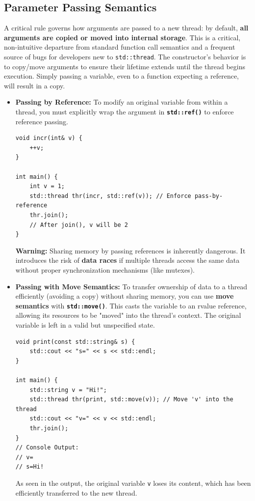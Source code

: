 \documentclass{article} %
\begin{document}
\subsection{Parameter Passing Semantics}
A critical rule governs how arguments are passed to a new thread: by default, \textbf{all arguments are copied or moved into internal storage}. This is a critical, non-intuitive departure from standard function call semantics and a frequent source of bugs for developers new to \texttt{std::thread}. The constructor's behavior is to copy/move arguments to ensure their lifetime extends until the thread begins execution. Simply passing a variable, even to a function expecting a reference, will result in a copy.
\begin{itemize}
    \item \textbf{Passing by Reference:} To modify an original variable from within a thread, you must explicitly wrap the argument in \textbf{\texttt{std::ref()}} to enforce reference passing.
\begin{verbatim}
void incr(int& v) {
    ++v;
}

int main() {
    int v = 1;
    std::thread thr(incr, std::ref(v)); // Enforce pass-by-reference
    thr.join();
    // After join(), v will be 2
}
\end{verbatim}
\noindent \textbf{Warning:} Sharing memory by passing references is inherently dangerous. It introduces the risk of \textbf{data races} if multiple threads access the same data without proper synchronization mechanisms (like mutexes).
    \item \textbf{Passing with Move Semantics:} To transfer ownership of data to a thread efficiently (avoiding a copy) without sharing memory, you can use \textbf{move semantics} with \textbf{\texttt{std::move()}}. This casts the variable to an rvalue reference, allowing its resources to be "moved" into the thread's context. The original variable is left in a valid but unspecified state.
\begin{verbatim}
void print(const std::string& s) {
    std::cout << "s=" << s << std::endl;
}

int main() {
    std::string v = "Hi!";
    std::thread thr(print, std::move(v)); // Move 'v' into the thread
    std::cout << "v=" << v << std::endl;
    thr.join();
}
// Console Output:
// v=
// s=Hi!
\end{verbatim}
As seen in the output, the original variable \texttt{v} loses its content, which has been efficiently transferred to the new thread.
\end{itemize}
\end{document}

